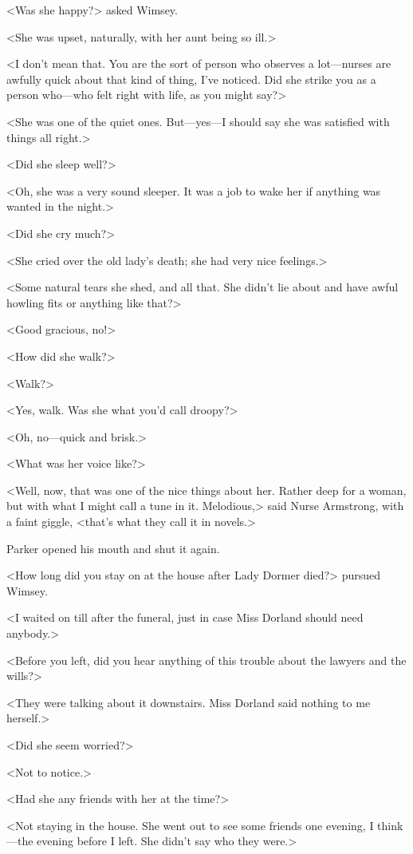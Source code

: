 <Was she happy?> asked Wimsey.

<She was upset, naturally, with her aunt being so ill.>

<I don't mean that. You are the sort of person who observes a lot—nurses are awfully quick about that kind of thing, I've noticed. Did she strike you as a person who—who felt right with life, as you might say?>

<She was one of the quiet ones. But—yes—I should say she was satisfied with things all right.>

<Did she sleep well?>

<Oh, she was a very sound sleeper. It was a job to wake her if anything was wanted in the night.>

<Did she cry much?>

<She cried over the old lady's death; she had very nice feelings.>

<Some natural tears she shed, and all that. She didn't lie about and have awful howling fits or anything like that?>

<Good gracious, no!>

<How did she walk?>

<Walk?>

<Yes, walk. Was she what you'd call droopy?>

<Oh, no—quick and brisk.>

<What was her voice like?>

<Well, now, that was one of the nice things about her. Rather deep for a woman, but with what I might call a tune in it. Melodious,> said Nurse Armstrong, with a faint giggle, <that's what they call it in novels.>

Parker opened his mouth and shut it again.

<How long did you stay on at the house after Lady Dormer died?> pursued Wimsey.

<I waited on till after the funeral, just in case Miss Dorland should need anybody.>

<Before you left, did you hear anything of this trouble about the lawyers and the wills?>

<They were talking about it downstairs. Miss Dorland said nothing to me herself.>

<Did she seem worried?>

<Not to notice.>

<Had she any friends with her at the time?>

<Not staying in the house. She went out to see some friends one evening, I think—the evening before I left. She didn't say who they were.>

